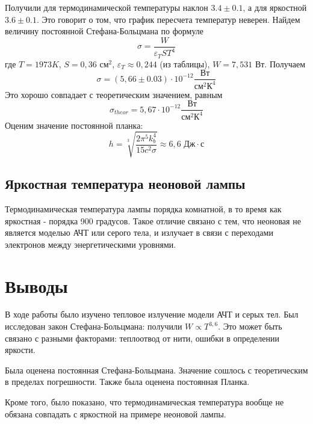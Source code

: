 \documentclass[a4paper, 12pt]{article}
\begin{document}
Получили для термодинамической температуры наклон $3.4 \pm 0.1$, а для яркостной $3.6 \pm 0.1$. Это говорит о том, что график пересчета температур неверен.
Найдем величину постоянной Стефана-Больцмана по формуле
\begin{equation}
	\sigma = \frac{W}{\varepsilon_T S T^4}
\end{equation}
где $T = 1973 K$, $S = 0,36 \text{ см}^2$, $\varepsilon_T \approx 0,244$ (из таблицы), $W = 7,531 \text{ Вт}$. Получаем 
\begin{equation*}
	\sigma = (5,66 \pm 0.03)\cdot 10^{-12} \frac{\text{Вт}}{\text{см}^2\text{К}^4}
\end{equation*}
Это хорошо совпадает с теоретическим значением, равным
\begin{equation*}
	\sigma_{theor} = 5,67\cdot 10^{-12}\frac{\text{Вт}}{\text{см}^2\text{К}^4}
\end{equation*}
Оценим значение постоянной планка:
\begin{equation*}
	h = \sqrt[3]{\frac{2 \pi ^5 k_b^4}{15 c^2 \sigma}} \approx 6,6 \text{ Дж}\cdot \text{с}
\end{equation*}
\subsection*{Яркостная температура неоновой лампы}
Термодинамическая температура лампы порядка комнатной, в то время как яркостная - порядка 900 градусов. Такое отличие связано с тем, что неоновая не является моделью АЧТ или серого тела, и излучает в связи с переходами электронов между энергетическими уровнями.

\section{Выводы}
В ходе работы было изучено тепловое излучение модели АЧТ и серых тел. Был исследован закон Стефана-Больцмана: получили $W \propto T^{3,6}$. Это может быть связано с разными факторами: теплоотвод от нити, ошибки в определении яркости. 

Была оценена постоянная Стефана-Больцмана. Значение сошлось с теоретическим в пределах погрешности. Также была оценена постоянная Планка.

Кроме того, было показано, что термодинамическая температура вообще не обязана совпадать с яркостной на примере неоновой лампы.
\end{document}
